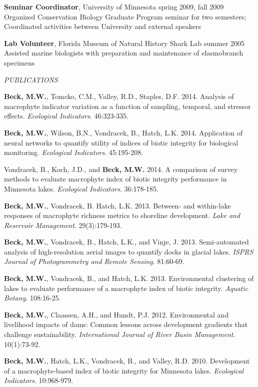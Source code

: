 \documentclass[letterpaper,12pt]{article}
\newcommand{\sectitle}[1]{\vspace{\baselineskip} \centerline{\large{\textit{#1}}}}
\begin{document}
{\bf Seminar Coordinator}, University of Minnesota \hfill spring 2009, fall 2009  \\
Organized Conservation Biology Graduate Program seminar for two semesters; Coordinated activities between University and external speakers

{\bf Lab Volunteer}, Florida Museum of Natural History Shark Lab \hfill summer 2005 \\
Assisted marine biologists with preparation and maintenance of elasmobranch specimens

\sectitle{PUBLICATIONS}

\textbf{Beck, M.W.}, Tomcko, C.M., Valley, R.D., Staples, D.F. 2014. Analysis of macrophyte indicator variation as a function of sampling, temporal, and stressor effects. \textit{Ecological Indicators}. 46:323-335.

\textbf{Beck, M.W.}, Wilson, B.N., Vondracek, B., Hatch, L.K. 2014. Application of neural networks to quantify utility of indices of biotic integrity for biological monitoring. \textit{Ecological Indicators}. 45:195-208.

Vondracek, B., Koch, J.D., and \textbf{Beck, M.W.} 2014. A comparison of survey methods to evaluate macrophyte index of biotic integrity performance in Minnesota lakes. \textit{Ecological Indicators}. 36:178-185.

\textbf{Beck, M.W.}, Vondracek, B. Hatch, L.K. 2013. Between- and within-lake responses of macrophyte richness metrics to shoreline development. \textit{Lake and Reservoir Management}. 29(3):179-193.

\textbf{Beck, M.W.}, Vondracek, B., Hatch, L.K., and Vinje, J. 2013. Semi-automated analysis of high-resolution aerial images to quantify docks in glacial lakes. \textit{ISPRS Journal of Photogrammetry and Remote Sensing}. 81:60-69.

\textbf{Beck, M.W.}, Vondracek, B., and Hatch, L.K. 2013. Environmental clustering of lakes to evaluate performance of a macrophyte index of biotic integrity. \textit{Aquatic Botany}. 108:16-25.

\textbf{Beck, M.W.}, Claassen, A.H., and Hundt, P.J. 2012. Environmental and livelihood impacts of dams: Common lessons across development gradients that challenge sustainability. \textit{International Journal of River Basin Management}. 10(1):73-92.

\textbf{Beck, M.W.}, Hatch, L.K., Vondracek, B., and Valley, R.D. 2010. Development of a macrophyte-based index of biotic integrity for Minnesota lakes. \textit{Ecological Indicators}. 10:968-979.
\end{document}
